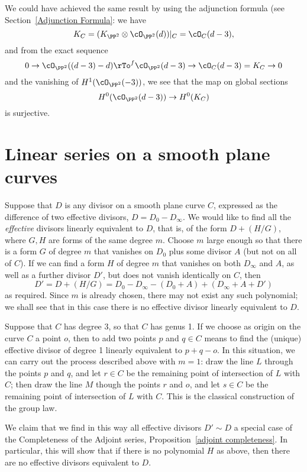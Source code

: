We could have achieved the same result by using the adjunction formula (see Section~\ref{Adjunction Formula}: we have
$$
K_C = (K_{\PP^2} \otimes \cO_{\PP^2}(d))|_C = \cO_C(d-3),
$$
and from the exact sequence
$$
0 \to \cO_{\PP^2}((d-3)-d) \rTo^f \cO_{\PP^2}(d-3) \to \cO_C(d-3)=K_C \to 0
$$
and the vanishing of $H^1(\cO_{\PP^2}(-3))$, we see that the map on global sections
$$
H^0(\cO_{\PP^2}(d-3)) \to H^0(K_C)
$$
is surjective. 


\section{Linear series on a smooth plane curves}\label{linear series on smooth plane curves}

Suppose that $D$ is any divisor on a smooth plane curve $C$, expressed as the difference of
two effective divisors, $D= D_0-D_\infty$. We would like to find all the \emph{effective} divisors linearly equivalent to $D$, that is, of the form
$D + (H/G)$, where $G, H$ are forms of the same degree $m$. Choose $m$ large enough so that
there is
 a form $G$ of degree $m$ that vanishes on $D_0$ plus some divisor $A$ (but not on all of $C$). If we can find a form $H$ of degree $m$ that vanishes on both $D_\infty$ and $A$, as well as a further divisor $D'$, but does not vanish identically on $C$, then
$$
D' = D + (H/G) = D_0- D_\infty - (D_0+A)+(D_\infty+A+D')
$$
as required. Since $m$ is already chosen, there may not exist any such polynomial; we shall see that in this case there is no effective divisor linearly equivalent to $D$. 

\begin{example}
Suppose that $C$ has degree 3, so that $C$ has genus 1. If we choose as origin on the curve $C$ a point $o$, then to add two points $p$ and $q \in C$ means to find the (unique) effective divisor of degree 1 linearly equivalent to $p + q - o$. In this situation, we can carry out the process described above with $m=1$: draw the line $L$ through the points $p$ and $q$, and let $r \in C$ be the remaining point of intersection of $L$ with $C$; then draw the line $M$ though the points $r$ and $o$, and let $s \in C$ be the remaining point of intersection of $L$ with $C$. This is the classical construction of the group law.
\end{example}

We claim that we find in this way all effective divisors $D' \sim D$ a special case of the Completeness of the Adjoint series, Proposition~\ref{adjoint completeness}. In particular, this will show that if there is no polynomial $H$ as above, then there are no effective divisors equivalent to $D$.

